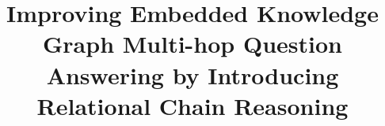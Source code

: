 \documentclass[pdflatex,sn-mathphys]{sn-jnl}%
\theoremstyle{thmstyleone}%
\theoremstyle{thmstyletwo}%
\theoremstyle{thmstylethree}%
\begin{document}

\title[Relational Chain Reasoning Improved Embedded KGQA]{Improving Embedded Knowledge Graph Multi-hop Question Answering by Introducing Relational Chain Reasoning}











\end{document}
